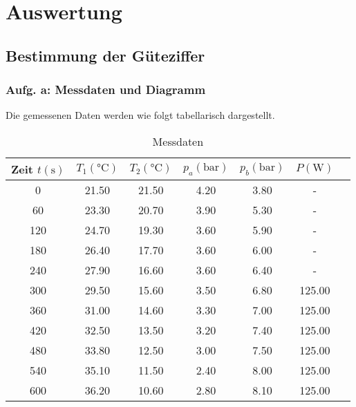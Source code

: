 \newpage
\section{Auswertung}
\label{sec:Auswertung}

\subsection{Bestimmung der Güteziffer}

\subsubsection{Aufg. a: Messdaten und Diagramm}

Die gemessenen Daten werden wie folgt tabellarisch dargestellt. 

\begin{table}
  \centering
  \caption{Messdaten}
  \label{tab:Messdaten}
  \begin{tabular}{c c c c c c c}  %
    \toprule
    {Zeit $t (\unit{\second})$} &
    {$T_{1} (\unit{\celsius})$}&
    {$T_{2} (\unit{\celsius})$}&
    {$p_{a} (\unit{\bar})$}&
    {$p_{b} (\unit{\bar})$}&
    {$P (\unit{\watt})$} \\
    \midrule
       0 &    21.50 &     21.50 &       4.20 &       3.80 &      - \\
      60 &    23.30 &     20.70 &       3.90 &       5.30 &      - \\
     120 &    24.70 &     19.30 &       3.60 &       5.90 &      - \\
     180 &    26.40 &     17.70 &       3.60 &       6.00 &      - \\
     240 &    27.90 &     16.60 &       3.60 &       6.40 &      - \\
     300 &    29.50 &     15.60 &       3.50 &       6.80 & 125.00 \\
     360 &    31.00 &     14.60 &       3.30 &       7.00 & 125.00 \\
     420 &    32.50 &     13.50 &       3.20 &       7.40 & 125.00 \\
     480 &    33.80 &     12.50 &       3.00 &       7.50 & 125.00 \\
     540 &    35.10 &     11.50 &       2.40 &       8.00 & 125.00 \\
     600 &    36.20 &     10.60 &       2.80 &       8.10 & 125.00 \\

\end{tabular}
\end{table}
